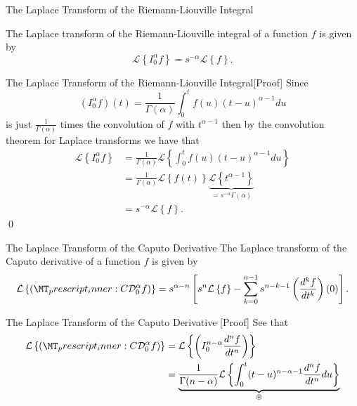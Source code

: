 \documentclass[pdf]{beamer}
\newcommand{\laplace}[1]{ \mathcal{L} \left\{ #1 \right\} }
\newcommand{\rli}[3]{ \left( I_{#1}^{#2} #3 \right) }
\newcommand{\der}[3]{ \frac{d^{#3}#1}{d#2^{#3}} }
\newcommand{\capder}[3]{ \left( \prescript{C}{}{\mathcal{D}_{#1}^{#2}} #3 \right) }
\begin{document}
\begin{frame}{The Laplace Transform of the Riemann-Liouville Integral}
	\begin{lemma}
	The Laplace transform of the Riemann-Liouville integral of a function $ f $ is given by
		$$ \mathcal{L} \left\{ I_0^\alpha f \right\}  = s^{-\alpha} \mathcal{L} \left\{ f \right\}.	$$
	\end{lemma}
\end{frame}

\begin{frame}{The Laplace Transform of the Riemann-Liouville Integral[Proof]}
	Since 
	$$
		 (I_0^\alpha f)(t) = \frac{1}{\Gamma(\alpha)} \int_0^t f(u) (t-u)^{\alpha - 1} du
	$$
	is just $ \frac{1}{\Gamma(\alpha)} $ times the convolution of $ f $ with $ t^{\alpha - 1} $ then by the convolution theorem
	for Laplace transforms we have that 
	\begin{align*}
		\mathcal{L} \left\{ I_0^\alpha f \right\} &= \frac{1}{\Gamma(\alpha)} \mathcal{L} \left\{ \int_{0}^{t} f(u) (t-u)^{\alpha - 1} du \right\} \\
			&= \frac{1}{\Gamma(\alpha)} \mathcal{L} \left\{ f(t) \right\} \underbrace{\mathcal{L} \left\{ t^{\alpha - 1} \right\}}_{=s^{-\alpha} \Gamma(\alpha)} \\
			&= s^{-\alpha} \mathcal{L} \left\{ f \right\}.
	\end{align*}
	\qed
\end{frame}

\begin{frame}{The Laplace Transform of the Caputo Derivative}
	The Laplace transform of the Caputo derivative of  a function $ f $ is given by
	\begin{align*}
		\laplace{\capder{0}{\alpha}{f}} = s^{\alpha - n} \left[ s^n \laplace{f} - \sum_{k=0}^{n-1} s^{n-k-1} \left( \der{f}{t}{k} \right)(0) \right].
	\end{align*}
\end{frame}

\begin{frame}{The Laplace Transform of the Caputo Derivative [Proof]}
	See that
	\begin{align*}
		\laplace{\capder{0}{\alpha}{f}} &= \laplace{  \rli{0}{n-\alpha}{\der{f}{t}{n}}} \\
			&= \underbrace{\frac{1}{\Gamma(n-\alpha)}\laplace{ \int_0^t (t-u)^{n-\alpha-1} \der{f}{t}{n} du}}_{\circledast} \\ 
	\end{align*}
\end{frame}
\end{document}

